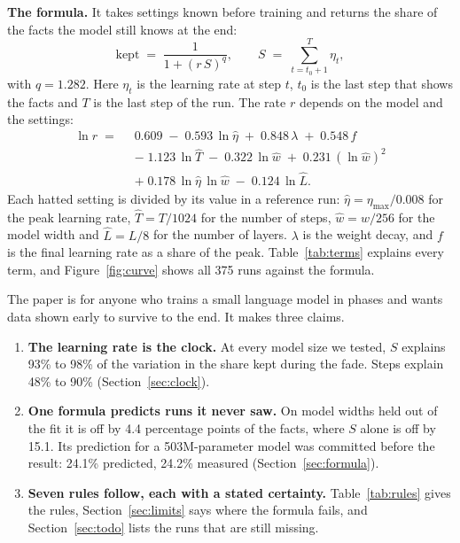 \documentclass{article}
\newcommand{\kept}{\mathrm{kept}}
\newcommand{\etamax}{\eta_{\max}}
\newcommand{\he}{\hat{\eta}}
\newcommand{\hT}{\hat{T}}
\newcommand{\hw}{\hat{w}}
\newcommand{\hL}{\hat{L}}
\begin{document}
\textbf{The formula.} It takes settings known before training and returns the share of the facts the model still knows at the end:
\begin{equation}
\kept \;=\; \frac{1}{1+(r\,S)^{q}}, \qquad S \;=\; \sum_{t=t_0+1}^{T} \eta_t ,
\label{eq:kept}
\end{equation}
with $q = 1.282$. Here $\eta_t$ is the learning rate at step $t$, $t_0$ is the last step that shows the facts and $T$ is the last step of the run. The rate $r$ depends on the model and the settings:
\begin{equation}
\begin{aligned}
\ln r \;=\;\; & 0.609 \;-\; 0.593\,\ln\he \;+\; 0.848\,\lambda \;+\; 0.548\,f \\
 & -\; 1.123\,\ln\hT \;-\; 0.322\,\ln\hw \;+\; 0.231\,(\ln\hw)^{2} \\
 & +\; 0.178\,\ln\he\,\ln\hw \;-\; 0.124\,\ln\hL .
\end{aligned}
\label{eq:rate}
\end{equation}
Each hatted setting is divided by its value in a reference run: $\he = \etamax/0.008$ for the peak learning rate, $\hT = T/1024$ for the number of steps, $\hw = w/256$ for the model width and $\hL = L/8$ for the number of layers. $\lambda$ is the weight decay, and $f$ is the final learning rate as a share of the peak. Table~\ref{tab:terms} explains every term, and Figure~\ref{fig:curve} shows all 375 runs against the formula.

The paper is for anyone who trains a small language model in phases and wants data shown early to survive to the end. It makes three claims.

\begin{enumerate}
\item \textbf{The learning rate is the clock.} At every model size we tested, $S$ explains 93\% to 98\% of the variation in the share kept during the fade. Steps explain 48\% to 90\% (Section~\ref{sec:clock}).
\item \textbf{One formula predicts runs it never saw.} On model widths held out of the fit it is off by 4.4 percentage points of the facts, where $S$ alone is off by 15.1. Its prediction for a 503M-parameter model was committed before the result: 24.1\% predicted, 24.2\% measured (Section~\ref{sec:formula}).
\item \textbf{Seven rules follow, each with a stated certainty.} Table~\ref{tab:rules} gives the rules, Section~\ref{sec:limits} says where the formula fails, and Section~\ref{sec:todo} lists the runs that are still missing.
\end{enumerate}
\end{document}
